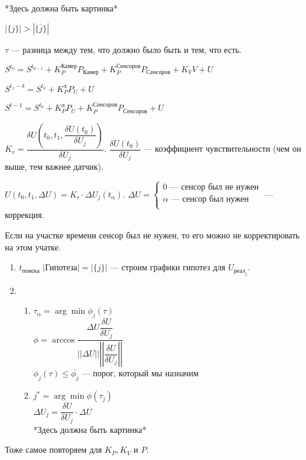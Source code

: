 \documentclass[a4paper]{article}
\begin{document}
*Здесь должна быть картинка*

$|\{j\}| > |\{\overline{j}\}|$

$\tau$ — разница между тем, что должно было быть и тем, что есть.

$S^{t_0} = S^{t_{0-1}} + K_P^\text{Камер}P_\text{Камер} + K_P^\text{Сенсоров}P_\text{Сенсоров} + K_VV + U$

$S^{t_1 - \delta} = S^{t_0} + K_P^\text{л}P_U + U$

$S^{t-1} = S^{t_0} + K_P^\text{л}P_U + K_P^\text{Сенсоров}P_\text{Сенсоров} + U$

$K_r = \dfrac{\delta U(t_0, t_1, \dfrac{\delta U(t_0)}{\delta U_j})}{\delta U_j}$. $\dfrac{\delta U(t_0)}{\delta U_j}$ — коэффициент чувствительности (чем он выше, тем важнее датчик).

$U(t_0, t_1, \Delta U) = K_r \cdot \Delta U_j(t_\alpha)$. $\Delta U = \begin{cases}
        0 \text{ — сенсор был не нужен}   \\
        \alpha \text{ — сенсор был нужен} \\
    \end{cases}$ — коррекция.

Если на участке времени сенсор был не нужен, то его можно не корректировать на этом учатке.
\begin{enumerate}
    \item $t_\text{поиска}$ $|\text{Гипотеза}| = |\{j\}|$ — строим графики гипотез для $U_{\text{реал}_j}$.
    \item \begin{enumerate}
              \item $\tau_\alpha = \arg \min \phi_j(\tau)$ \\
                    $\phi = \arccos \dfrac{\Delta U \dfrac{\delta U}{\delta U_j}}{||\Delta U|| \left|\left|\dfrac{\delta U}{\delta U_j}\right|\right|}$ \\
                    $\phi_j(\tau) \leq \overline{\phi_j}$ — порог, который мы назначим
              \item $j^* = \arg \min \phi(\tau_j)$ \\
                    $\Delta U_j = \dfrac{\delta U}{\delta U_j} \cdot \Delta U$ \\
                    *Здесь должна быть картинка*
          \end{enumerate}
\end{enumerate}

Тоже самое повторяем для $K_P, K_V$ и $P$.
\end{document}
